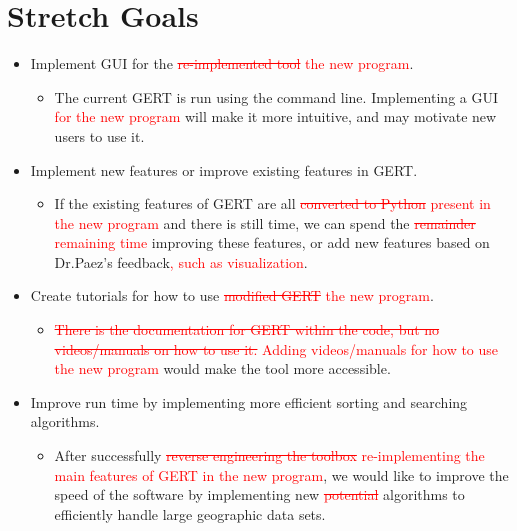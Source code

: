 \documentclass{article}
\begin{document}
\section{Stretch Goals}
\begin{itemize}
    \item Implement GUI for the \textcolor{red}{\sout{re-implemented tool} the new program}.
    \begin{itemize}
        \item The current GERT is run using the command line. Implementing a GUI \textcolor{red}{for the new program} will make it more intuitive, and may motivate new users to use it.
    \end{itemize}
    \item Implement new features or improve existing features in GERT.
    \begin{itemize}
        \item If the existing features of GERT are all \textcolor{red}{\sout{converted to Python} present in the new program} and there is still time, we can spend the \textcolor{red}{\sout{remainder} remaining time} improving these features, or add new features based on Dr.Paez's feedback\textcolor{red}{, such as visualization}.
    \end{itemize}
    \item Create tutorials for how to use \textcolor{red}{\sout{modified GERT} the new program}.
    \begin{itemize}
        \item \textcolor{red}{\sout{There is the documentation for GERT within the code, but no videos/manuals on how to use it.} Adding videos/manuals for how to use the new program} would make the tool more accessible.
    \end{itemize}
    \item Improve run time by implementing more efficient sorting and searching algorithms.
    \begin{itemize}
        \item After successfully \textcolor{red}{\sout{reverse engineering the toolbox} re-implementing the main features of GERT in the new program}, we would like to improve the speed of the software by implementing new \textcolor{red}{\sout{potential}} algorithms to efficiently handle large geographic data sets.
    \end{itemize}
\end{itemize}
\end{document}

